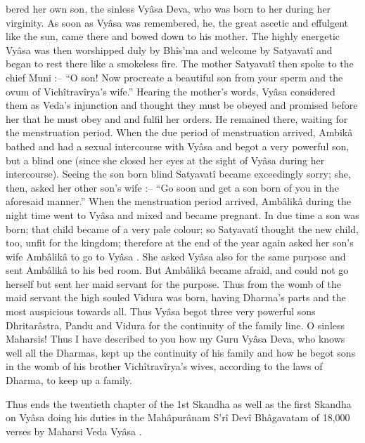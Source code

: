 bered her own son, the sinless Vyâsa  Deva, who was born to her during her virginity. As soon as Vyâsa was remembered, he, the great ascetic and effulgent like the sun, came there and bowed down to his mother. The highly energetic Vyâsa was then worshipped duly by Bhîs’ma and welcome by Satyavatî and began to rest there like a smokeless fire. The mother Satyavatî then spoke to the chief Muni :-- “O son! Now procreate a beautiful son from your sperm and the ovum of Vichîtravîrya's wife.” Hearing the mother's words, Vyâsa  considered them as Veda's injunction and thought they must be obeyed and promised before her that he must obey and and fulfil her orders. He remained there, waiting for the menstruation period. When the due period of menstruation arrived, Ambikâ bathed and had a sexual intercourse with Vyâsa  and begot a very powerful son, but a blind one (since she closed her eyes at the sight of Vyâsa  during her intercourse). Seeing the son born blind Satyavatî became exceedingly sorry; she, then, asked her other son's wife :-- “Go soon and get a son born of you in the aforesaid manner.” When the menstruation period arrived, Ambâlikâ during the night time went to Vyâsa  and mixed and became pregnant. In due time a son was born; that child became of a very pale colour; so Satyavatî thought the new child, too, unfit for the kingdom; therefore at the end of the year again asked her son's wife Ambâlikâ to go to Vyâsa . She asked Vyâsa  also for the same purpose and sent Ambâlikâ to his bed room. But Ambâlikâ became afraid, and could not go herself but sent her maid servant for the purpose. Thus from the womb of the maid servant the high souled Vidura was born, having Dharma's parts and the most auspicious towards all. Thus Vyâsa  begot three very powerful sons Dhritarâstra, Pandu and Vidura for the continuity of the family line. O sinless Maharsis! Thus I have described to you how my Guru Vyâsa  Deva, who knows well all the Dharmas, kept up the continuity of his family and how he begot sons in the womb of his brother Vichîtravîrya's wives, according to the laws of Dharma, to keep up a family.

 

Thus ends the twentieth chapter of the 1st Skandha as well as the first Skandha on Vyâsa  doing his duties in the Mahâpurânam S'rî Devî Bhâgavatam of 18,000 verses by Maharsi Veda Vyâsa .

 